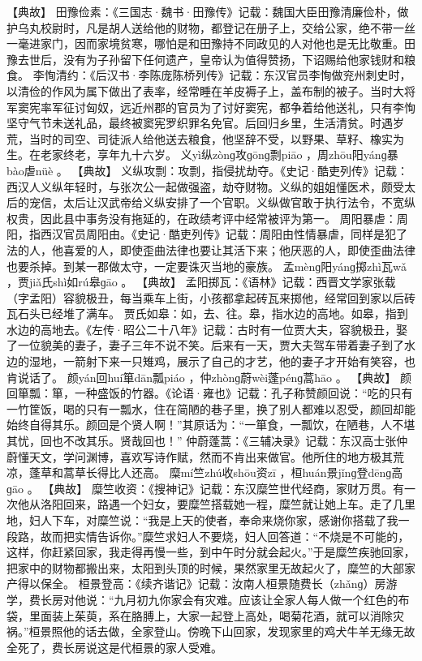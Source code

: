 \documentclass[12pt,UTF8]{ctexbook}
\begin{document}
【典故】
田豫俭素：《三国志·魏书·田豫传》记载：魏国大臣田豫清廉俭朴，做护乌丸校尉时，凡是胡人送给他的财物，都登记在册子上，交给公家，绝不带一丝一毫进家门，因而家境贫寒，哪怕是和田豫持不同政见的人对他也是无比敬重。田豫去世后，没有为子孙留下任何遗产，皇帝认为值得赞扬，下诏赐给他家钱财和粮食。
李恂清约：《后汉书·李陈庞陈桥列传》记载：东汉官员李恂做兖州刺史时，以清俭的作风为属下做出了表率，经常睡在羊皮褥子上，盖布制的被子。当时大将军窦宪率军征讨匈奴，远近州郡的官员为了讨好窦宪，都争着给他送礼，只有李恂坚守气节未送礼品，最终被窦宪罗织罪名免官。后回归乡里，生活清贫。时遇岁荒，当时的司空、司徒派人给他送去粮食，他坚辞不受，以野果、草籽、橡实为生。在老家终老，享年九十六岁。
义yì纵zònɡ攻ɡōnɡ剽piāo
，周zhōu阳yánɡ暴bào虐nüè
。
【典故】
义纵攻剽：攻剽，指侵扰劫夺。《史记·酷吏列传》记载：西汉人义纵年轻时，与张次公一起做强盗，劫夺财物。义纵的姐姐懂医术，颇受太后的宠信，太后让汉武帝给义纵安排了一个官职。义纵做官敢于执行法令，不宽纵权贵，因此县中事务没有拖延的，在政绩考评中经常被评为第一。
周阳暴虐：周阳，指西汉官员周阳由。《史记·酷吏列传》记载：周阳由性情暴虐，同样是犯了法的人，他喜爱的人，即使歪曲法律也要让其活下来；他厌恶的人，即使歪曲法律也要杀掉。到某一郡做太守，一定要诛灭当地的豪族。
孟mènɡ阳yánɡ掷zhì瓦wǎ
，贾jiǎ氏shì如rú皋ɡāo
。
【典故】
孟阳掷瓦：《语林》记载：西晋文学家张载（字孟阳）容貌极丑，每当乘车上街，小孩都拿起砖瓦来掷他，经常回到家以后砖瓦石头已经堆了满车。
贾氏如皋：如，去、往。皋，指水边的高地。如皋，指到水边的高地去。《左传·昭公二十八年》记载：古时有一位贾大夫，容貌极丑，娶了一位貌美的妻子，妻子三年不说不笑。后来有一天，贾大夫驾车带着妻子到了水边的湿地，一箭射下来一只雉鸡，展示了自己的才艺，他的妻子才开始有笑容，也肯说话了。
颜yán回huí箪dān瓢piáo
，仲zhònɡ蔚wèi蓬pénɡ蒿hāo
。
【典故】
颜回箪瓢：箪，一种盛饭的竹器。《论语·雍也》记载：孔子称赞颜回说：“吃的只有一竹筐饭，喝的只有一瓢水，住在简陋的巷子里，换了别人都难以忍受，颜回却能始终自得其乐。颜回是个贤人啊！”其原话为：“一箪食，一瓢饮，在陋巷，人不堪其忧，回也不改其乐。贤哉回也！”
仲蔚蓬蒿：《三辅决录》记载：东汉高士张仲蔚懂天文，学问渊博，喜欢写诗作赋，然而不肯出来做官。他所住的地方极其荒凉，蓬草和蒿草长得比人还高。
糜mí竺zhú收shōu资zī
，桓huán景jǐnɡ登dēnɡ高ɡāo
。
【典故】
糜竺收资：《搜神记》记载：东汉糜竺世代经商，家财万贯。有一次他从洛阳回来，路遇一个妇女，要糜竺搭载她一程，糜竺就让她上车。走了几里地，妇人下车，对糜竺说：“我是上天的使者，奉命来烧你家，感谢你搭载了我一段路，故而把实情告诉你。”糜竺求妇人不要烧，妇人回答道：“不烧是不可能的，这样，你赶紧回家，我走得再慢一些，到中午时分就会起火。”于是糜竺疾驰回家，把家中的财物都搬出来，太阳到头顶的时候，果然家里无故起火了，糜竺的大部家产得以保全。
桓景登高：《续齐谐记》记载：汝南人桓景随费长（zhǎnɡ）房游学，费长房对他说：“九月初九你家会有灾难。应该让全家人每人做一个红色的布袋，里面装上茱萸，系在胳膊上，大家一起登上高处，喝菊花酒，就可以消除灾祸。”桓景照他的话去做，全家登山。傍晚下山回家，发现家里的鸡犬牛羊无缘无故全死了，费长房说这是代桓景的家人受难。
\end{document}
